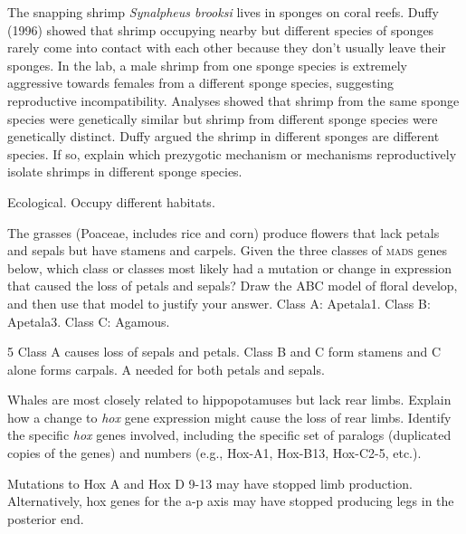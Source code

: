 \newpage


\question[10]
The snapping shrimp \textit{Synalpheus brooksi} lives in sponges on coral reefs.  Duffy (1996) showed that shrimp occupying nearby but different species of sponges rarely come into contact with each other because they don't usually leave their sponges. In the lab, a male shrimp from one sponge species is extremely aggressive towards females from a different sponge species, suggesting reproductive incompatibility. Analyses showed that shrimp from the same sponge species were genetically similar but shrimp from different sponge species were genetically distinct. Duffy argued the shrimp in different sponges are different species.  If so, explain which prezygotic mechanism or mechanisms reproductively isolate shrimps in different sponge species.
	\begin{solution}
	Ecological. Occupy different habitats.
	\end{solution}


\newpage

\question[10]
The grasses (Poaceae, includes rice and corn) produce flowers that lack petals and sepals but have stamens and carpels.  Given the three classes of \textsc{mads} genes below, which class or classes most likely had a mutation or change in expression that caused the loss of petals and sepals?  Draw the ABC model of floral develop, and then use that model to justify your answer.  Class A: Apetala1.  Class B: Apetala3.  Class C: Agamous.

	\begin{AnswerPage}{5\basespace}
	Class A causes loss of sepals and petals. Class B and C form stamens and C alone forms carpals. A needed for both petals and sepals. 
	\end{AnswerPage}
	

\question[10]
Whales are most closely related to hippopotamuses but lack rear limbs.  Explain how a change to \emph{hox} gene expression might cause the loss of rear limbs. Identify the specific \emph{hox} genes involved, including the specific set of paralogs (duplicated copies of the genes) and numbers (e.g., Hox-A1, Hox-B13, Hox-C2-5, etc.).

	\begin{solution}
	Mutations to Hox A and Hox D 9-13 may have stopped limb production. Alternatively, hox genes for the a-p axis may have stopped producing legs in the posterior end.
	\end{solution}

